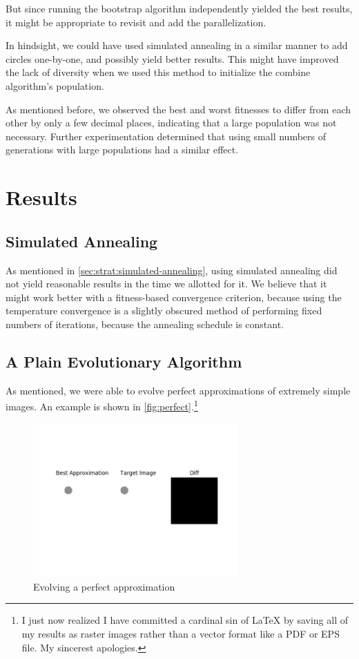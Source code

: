 \documentclass{article}
\begin{document}
But since running the bootstrap algorithm independently yielded the best results, it might be
appropriate to revisit and add the parallelization.

In hindsight, we could have used simulated annealing in a similar manner to add circles one-by-one,
and possibly yield better results. This might have improved the lack of diversity when we used this
method to initialize the combine algorithm's population.

As mentioned before, we observed the best and worst fitnesses to differ from each other by only a
few decimal places, indicating that a large population was not necessary. Further experimentation
determined that using small numbers of generations with large populations had a similar effect.

\section{Results}\label{sec:results}
\subsection{Simulated Annealing}\label{sec:results:simulated-annealing}
As mentioned in \autoref{sec:strat:simulated-annealing}, using simulated annealing did not yield
reasonable results in the time we allotted for it. We believe that it might work better with a
fitness-based convergence criterion, because using the temperature convergence is a slightly
obscured method of performing fixed numbers of iterations, because the annealing schedule is
constant.
\subsection{A Plain Evolutionary Algorithm}\label{sec:results:evolutionary-algorithm}
As mentioned, we were able to evolve perfect approximations of extremely simple images. An example
is shown in \autoref{fig:perfect}.\footnote{I just now realized I have committed a cardinal sin of
    \LaTeX{} by saving all of my results as raster images rather than a vector format like a PDF or
    EPS
    file. My sincerest apologies.}

\begin{figure}[H]
    \centering
    \includegraphics[width=0.7\textwidth]{output/evolve_perfect.png}
    \caption{Evolving a perfect approximation}\label{fig:perfect}
\end{figure}
\end{document}
